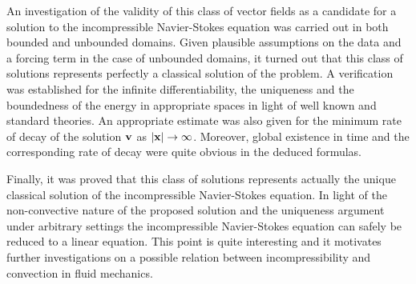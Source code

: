 \documentclass[a4 paper, 11pt,twoside]{article}
\newcommand{\V}{{\bf{v}}}
\newcommand{\X}{{\bf{x}}}
\newcommand{\0}{\Bf{0}}
\theoremstyle{definition}
\begin{document}
An investigation of the validity of this class of vector fields as a candidate for a solution to the incompressible Navier-Stokes equation was carried out in both bounded and unbounded domains. Given plausible assumptions on the data and a forcing term in the case of unbounded domains, it turned out that this class of solutions represents perfectly a classical solution of the problem. A verification was established for the infinite differentiability, the uniqueness and the boundedness of the energy in appropriate spaces in light of well known and standard theories. An appropriate estimate was also given for the minimum rate of decay of the solution $\V$ as $|\X|\rightarrow\infty$. Moreover, global existence in time and the corresponding rate of decay were quite obvious in the deduced formulas.

Finally, it was proved that this class of solutions represents actually the unique classical solution of the incompressible Navier-Stokes equation. In light of the non-convective nature of the proposed solution and the uniqueness argument under arbitrary settings the incompressible Navier-Stokes equation can safely be reduced to a linear equation. This point is quite interesting and it motivates further investigations on a possible relation between incompressibility and convection in fluid mechanics.
\end{document}
